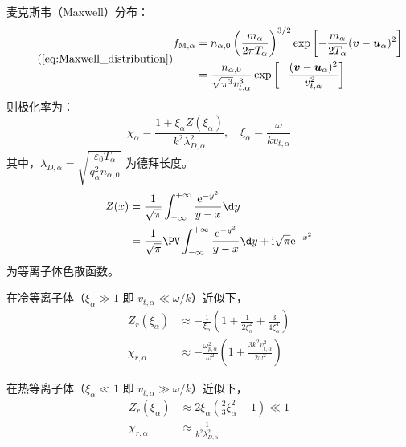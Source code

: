 麦克斯韦（Maxwell）分布：
\begin{equation} \tag{\ref{eq:Maxwell_distribution}} \begin{aligned}
f_{\text{M}, \alpha}
&= n_{\alpha, 0} \left(\frac{m_\alpha}{2 \pi T_\alpha}\right)^{3/2}
\exp{\left[- \frac{m_\alpha}{2 T_\alpha} (\vec{v} - \vec{u}_\alpha)^2\right]} \\
&= \frac{n_{\alpha, 0}}{\sqrt{\pi^3} v_{t, \alpha}^3}
\exp{\left[- \frac{(\vec{v} - \vec{u}_\alpha)^2}{v_{t, \alpha}^2}\right]}
\end{aligned}\end{equation}
则极化率为：
\begin{equation}
\chi_\alpha = \frac{1 + \xi_\alpha Z(\xi_\alpha)}{k^2 \lambda_{D,\alpha}^2},
\quad \xi_\alpha = \frac{\omega}{k v_{t,\alpha}}
\end{equation}
其中，$\lambda_{D, \alpha} = \sqrt{\dfrac{\varepsilon_0 T_\alpha}{q_\alpha^2 n_{\alpha, 0}}}$ 为德拜长度。
\begin{equation}\begin{aligned}
Z(x) &= \frac{1}{\sqrt{\pi}} \int_{-\infty}^{+\infty} \frac{\eu^{- y^2}}{y - x} \d y \\
&= \frac{1}{\sqrt{\pi}} \PV \int_{-\infty}^{+\infty} \frac{\eu^{- y^2}}{y - x} \d y
+ \im \sqrt{\pi} \eu^{-x^2}
\end{aligned}\end{equation}
为等离子体色散函数。

在冷等离子体（$\xi_\alpha \gg 1$ 即 $v_{t,\alpha} \ll \omega/k$）近似下，
\begin{subequations}\begin{align}
Z_r(\xi_\alpha) &\approx - \frac{1}{\xi_\alpha} \left(
    1 + \frac{1}{2 \xi_\alpha^2} + \frac{3}{4 \xi_\alpha^4}
\right) \\
\chi_{r, \alpha} &\approx - \frac{\omega_{p,\alpha}^2}{\omega^2} \left(
    1 + \frac{3 k^2 v_{t, \alpha}^2}{2 \omega^2}
\right)
\end{align}\end{subequations}

在热等离子体（$\xi_\alpha \ll 1$ 即 $v_{t,\alpha} \gg \omega/k$）近似下，
\begin{subequations}\begin{align}
Z_r(\xi_\alpha) &\approx 2 \xi_\alpha \left(
    \frac{2}{3} \xi_\alpha^2 - 1
\right) \ll 1 \\
\chi_{r, \alpha} &\approx \frac{1}{k^2 \lambda_{D,\alpha}^2}
\end{align}\end{subequations}

